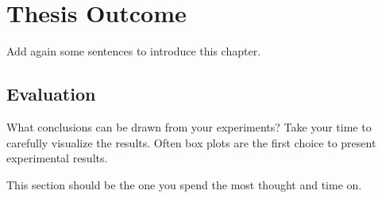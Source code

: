 \chapter{Thesis Outcome}
\label{cha:thesis_outcome}
Add again some sentences to introduce this chapter.

\section{Evaluation}
\label{sec:evaluation}
What conclusions can be drawn from your experiments?
Take your time to carefully visualize the results.
Often box plots are the first choice to present experimental results.

This section should be the one you spend the most thought and time on.

